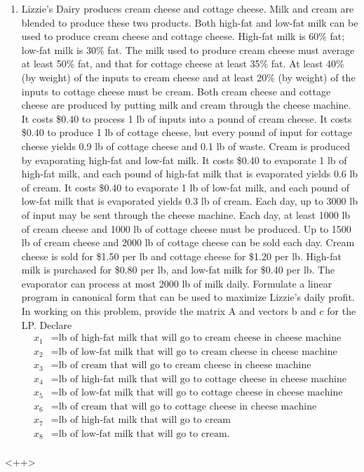\documentclass{article}
\begin{document}
\begin{enumerate}
	\item Lizzie’s Dairy produces cream cheese and cottage cheese. Milk and cream are blended to produce these two products. Both high-fat and low-fat milk can be used to produce cream cheese and cottage cheese. High-fat milk is 60\% fat; low-fat milk is 30\% fat. The milk used to produce cream cheese must average at least 50\% fat, and that for cottage cheese at least 35\% fat. At least 40\% (by weight) of the inputs to cream cheese and at least 20\% (by weight) of the inputs to cottage cheese must be cream. Both cream cheese and cottage cheese are produced by putting milk and cream through the cheese machine. It costs \$0.40 to process 1 lb of inputs into a pound of cream cheese. It costs \$0.40 to produce 1 lb of cottage cheese, but every pound of input for cottage cheese yields 0.9 lb of cottage cheese and 0.1 lb of waste. Cream is produced by evaporating high-fat and low-fat milk. It costs \$0.40 to evaporate 1 lb of high-fat milk, and each pound of high-fat milk that is evaporated yields 0.6 lb of cream. It costs \$0.40 to evaporate 1 lb of low-fat milk, and each pound of low-fat milk that is evaporated yields 0.3 lb of cream. Each day, up to 3000 lb of input may be sent through the cheese machine. Each day, at least 1000 lb of cream cheese and 1000 lb of cottage cheese must be produced. Up to 1500 lb of cream cheese and 2000 lb of cottage cheese can be sold each day. Cream cheese is sold for \$1.50 per lb	and cottage cheese for \$1.20 per lb. High-fat milk is purchased for \$0.80 per lb, and low-fat milk for \$0.40 per lb. The evaporator can process at most 2000 lb of milk daily. Formulate a linear program in canonical form that can be used to maximize Lizzie’s daily profit.
		In working on this problem, provide the matrix A and vectors b and c for the LP. Declare
		\begin{align*}
			x_1 &= \text{lb of high-fat milk that will go to cream cheese in cheese machine} \\
			x_2 &= \text{lb of low-fat milk that will go to cream cheese in cheese machine} \\
			x_3 &= \text{lb of cream that will go to cream cheese in cheese machine} \\
			x_4 &= \text{lb of high-fat milk that will go to cottage cheese in cheese machine} \\
			x_5 &= \text{lb of low-fat milk that will go to cottage cheese in cheese machine} \\
			x_6 &= \text{lb of cream that will go to cottage cheese in cheese machine} \\
			x_7 &= \text{lb of high-fat milk that will go to cream} \\
			x_8 &= \text{lb of low-fat milk that will go to cream.} \\
		\end{align*}

\end{enumerate}<++>
\end{document}
